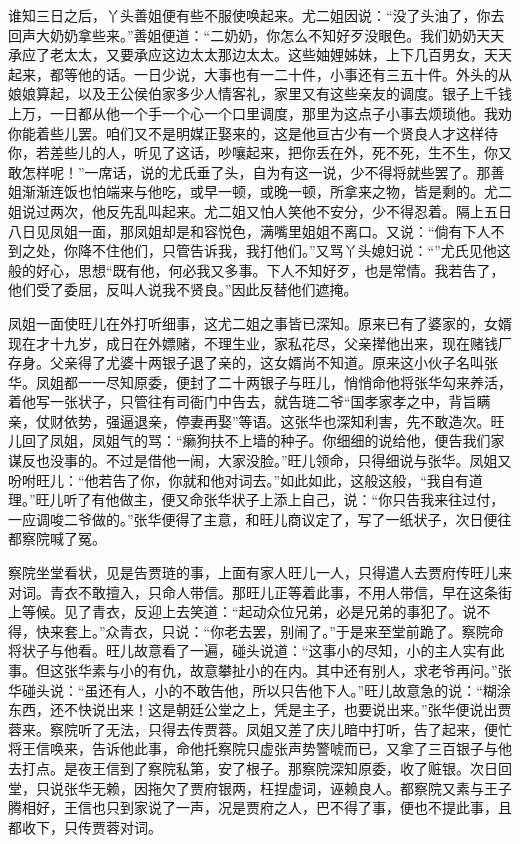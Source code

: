 谁知三日之后，丫头善姐便有些不服使唤起来。尤二姐因说：``没了头油了，你去回声大奶奶拿些来。''善姐便道：``二奶奶，你怎么不知好歹没眼色。我们奶奶天天承应了老太太，又要承应这边太太那边太太。这些妯娌姊妹，上下几百男女，天天起来，都等他的话。一日少说，大事也有一二十件，小事还有三五十件。外头的从娘娘算起，以及王公侯伯家多少人情客礼，家里又有这些亲友的调度。银子上千钱上万，一日都从他一个手一个心一个口里调度，那里为这点子小事去烦琐他。我劝你能着些儿罢。咱们又不是明媒正娶来的，这是他亘古少有一个贤良人才这样待你，若差些儿的人，听见了这话，吵嚷起来，把你丢在外，死不死，生不生，你又敢怎样呢！''一席话，说的尤氏垂了头，自为有这一说，少不得将就些罢了。那善姐渐渐连饭也怕端来与他吃，或早一顿，或晚一顿，所拿来之物，皆是剩的。尤二姐说过两次，他反先乱叫起来。尤二姐又怕人笑他不安分，少不得忍着。隔上五日八日见凤姐一面，那凤姐却是和容悦色，满嘴里姐姐不离口。又说：``倘有下人不到之处，你降不住他们，只管告诉我，我打他们。''又骂丫头媳妇说：``''尤氏见他这般的好心，思想``既有他，何必我又多事。下人不知好歹，也是常情。我若告了，他们受了委屈，反叫人说我不贤良。''因此反替他们遮掩。

凤姐一面使旺儿在外打听细事，这尤二姐之事皆已深知。原来已有了婆家的，女婿现在才十九岁，成日在外嫖赌，不理生业，家私花尽，父亲撵他出来，现在赌钱厂存身。父亲得了尤婆十两银子退了亲的，这女婿尚不知道。原来这小伙子名叫张华。凤姐都一一尽知原委，便封了二十两银子与旺儿，悄悄命他将张华勾来养活，着他写一张状子，只管往有司衙门中告去，就告琏二爷``国孝家孝之中，背旨瞒亲，仗财依势，强逼退亲，停妻再娶''等语。这张华也深知利害，先不敢造次。旺儿回了凤姐，凤姐气的骂：``癞狗扶不上墙的种子。你细细的说给他，便告我们家谋反也没事的。不过是借他一闹，大家没脸。''旺儿领命，只得细说与张华。凤姐又吩咐旺儿：``他若告了你，你就和他对词去。''如此如此，这般这般，``我自有道理。''旺儿听了有他做主，便又命张华状子上添上自己，说：``你只告我来往过付，一应调唆二爷做的。''张华便得了主意，和旺儿商议定了，写了一纸状子，次日便往都察院喊了冤。

察院坐堂看状，见是告贾琏的事，上面有家人旺儿一人，只得遣人去贾府传旺儿来对词。青衣不敢擅入，只命人带信。那旺儿正等着此事，不用人带信，早在这条街上等候。见了青衣，反迎上去笑道：``起动众位兄弟，必是兄弟的事犯了。说不得，快来套上。''众青衣，只说：``你老去罢，别闹了。''于是来至堂前跪了。察院命将状子与他看。旺儿故意看了一遍，碰头说道：``这事小的尽知，小的主人实有此事。但这张华素与小的有仇，故意攀扯小的在内。其中还有别人，求老爷再问。''张华碰头说：``虽还有人，小的不敢告他，所以只告他下人。''旺儿故意急的说：``糊涂东西，还不快说出来！这是朝廷公堂之上，凭是主子，也要说出来。''张华便说出贾蓉来。察院听了无法，只得去传贾蓉。凤姐又差了庆儿暗中打听，告了起来，便忙将王信唤来，告诉他此事，命他托察院只虚张声势警唬而已，又拿了三百银子与他去打点。是夜王信到了察院私第，安了根子。那察院深知原委，收了赃银。次日回堂，只说张华无赖，因拖欠了贾府银两，枉捏虚词，诬赖良人。都察院又素与王子腾相好，王信也只到家说了一声，况是贾府之人，巴不得了事，便也不提此事，且都收下，只传贾蓉对词。

